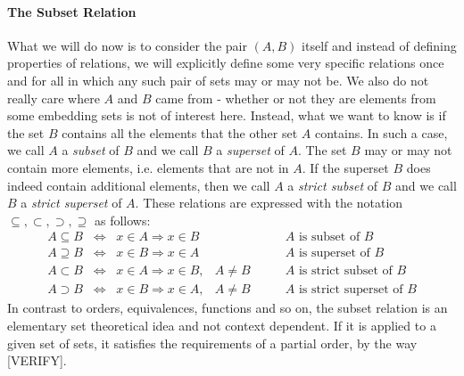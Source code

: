 \paragraph{The Subset Relation} 
What we will do now is to consider the pair $(A,B)$ itself and instead of defining properties of relations, we will explicitly define some very specific relations once and for all in which any such pair of sets may or may not be. We also do not really care where $A$ and $B$ came from - whether or not they are elements from some embedding sets is not of interest here. Instead, what we want to know is if the set $B$ contains all the elements that the other set $A$ contains. In such a case, we call $A$ a \emph{subset} of $B$ and we call $B$ a \emph{superset} of $A$. The set $B$ may or may not contain more elements, i.e. elements that are not in $A$. If the superset $B$ does indeed contain additional elements, then we call $A$ a \emph{strict subset} of $B$ and we call $B$ a \emph{strict superset} of $A$. These relations are expressed with the notation $\subseteq, \subset, \supset, \supseteq$ as follows:
\begin{eqnarray}
A \subseteq B \;\;  \Leftrightarrow \;\;   x \in A \Rightarrow x \in B&           \qquad & \text{$A$ is subset of $B$} \\
A \supseteq B \;\;  \Leftrightarrow \;\;   x \in B \Rightarrow x \in A&           \qquad & \text{$A$ is superset of $B$} \\
A \subset   B \;\;  \Leftrightarrow \;\;   x \in A \Rightarrow x \in B,& A \neq B \qquad & \text{$A$ is strict subset of $B$} \\
A \supset   B \;\;  \Leftrightarrow \;\;   x \in B \Rightarrow x \in A,& A \neq B \qquad & \text{$A$ is strict superset of $B$}
\end{eqnarray}
In contrast to orders, equivalences, functions and so on, the subset relation is an elementary set theoretical idea and not context dependent. If it is applied to a given set of sets, it satisfies the requirements of a partial order, by the way [VERIFY].

